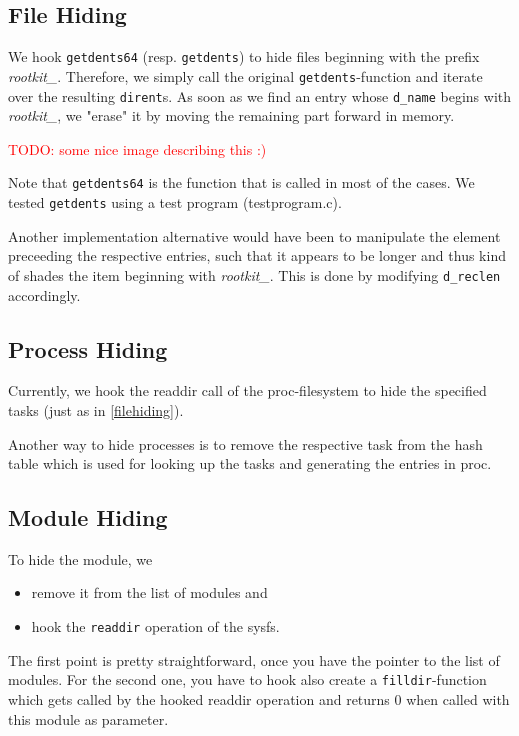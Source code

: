 \documentclass[10pt, letterpaper]{article}
\newcommand{\todo}[1]{\textcolor{red}{TODO: #1}}
\begin{document}
\subsection{File Hiding}
\label{filehiding}
We hook \texttt{getdents64} (resp. \texttt{getdents}) to hide files beginning with the prefix \textit{rootkit\_}. 
Therefore, we simply call the original \texttt{getdents}-function and iterate over the resulting
\texttt{dirent}s. As soon as we find an entry whose \texttt{d\_name} begins with \textit{rootkit\_},
we "erase" it by moving the remaining part forward in memory. 

\todo{some nice image describing this :)}

Note that \texttt{getdents64} is the function that is called in most of the cases.
We tested \texttt{getdents} using a test program (testprogram.c).

Another implementation alternative would have been to manipulate the element preceeding the respective entries, such that it 
appears to be longer and thus kind of shades the item beginning with \textit{rootkit\_}.
This is done by modifying \texttt{d\_reclen} accordingly.

\subsection{Process Hiding}
Currently, we hook the readdir call of the proc-filesystem to hide the specified
tasks (just as in \autoref{filehiding}).

Another way to hide processes is to remove the respective task from the hash table 
which is used for looking up the tasks and generating the entries in proc.

\subsection{Module Hiding}
To hide the module, we 
\begin{itemize}
 \item remove it from the list of modules and
 \item hook the \texttt{readdir} operation of the sysfs.
\end{itemize}

The first point is pretty straightforward, once you have the pointer to the list of modules.
For the second one, you have to hook also create a \texttt{filldir}-function which gets called by the hooked readdir operation and returns 0 when called with this module as parameter.
\end{document}
